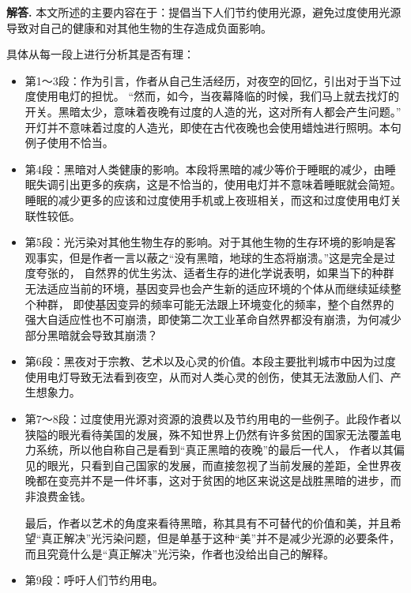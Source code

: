 \documentclass[12pt, a4paper, oneside]{ctexart}
\newenvironment{solution}[1][]{\par\noindent\textbf{#1解答. }}{\smallskip\par}  %
\begin{document}
\begin{solution}
    本文所述的主要内容在于：提倡当下人们节约使用光源，避免过度使用光源导致对自己的健康和对其他生物的生存造成负面影响。

    具体从每一段上进行分析其是否有理：
    \begin{itemize}
        \item 第1～3段：作为引言，作者从自己生活经历，对夜空的回忆，引出对于当下过度使用电灯的担忧。
        “然而，如今，当夜幕降临的时候，我们马上就去找灯的开关。黑暗太少，意味着夜晚有过度的人造的光，这对所有人都会产生问题。”
        开灯并不意味着过度的人造光，即使在古代夜晚也会使用蜡烛进行照明。本句例子使用不恰当。
        \item 第4段：黑暗对人类健康的影响。本段将黑暗的减少等价于睡眠的减少，由睡眠失调引出更多的疾病，这是不恰当的，使用电灯并不意味着睡眠就会简短。
        睡眠的减少更多的应该和过度使用手机或上夜班相关，而这和过度使用电灯关联性较低。
        \item 第5段：光污染对其他生物生存的影响。对于其他生物的生存环境的影响是客观事实，但是作者一言以蔽之“没有黑暗，地球的生态将崩溃。”这是完全是过度夸张的，
        自然界的优生劣汰、适者生存的进化学说表明，如果当下的种群无法适应当前的环境，基因变异也会产生新的适应环境的个体从而继续延续整个种群，
        即使基因变异的频率可能无法跟上环境变化的频率，整个自然界的强大自适应性也不可崩溃，即使第二次工业革命自然界都没有崩溃，为何减少部分黑暗就会导致其崩溃？
        \item 第6段：黑夜对于宗教、艺术以及心灵的价值。本段主要批判城市中因为过度使用电灯导致无法看到夜空，从而对人类心灵的创伤，使其无法激励人们、产生想象力。
        \item 第7～8段：过度使用光源对资源的浪费以及节约用电的一些例子。此段作者以狭隘的眼光看待美国的发展，殊不知世界上仍然有许多贫困的国家无法覆盖电力系统，所以他自称自己是看到“真正黑暗的夜晚”的最后一代人，
        作者以其偏见的眼光，只看到自己国家的发展，而直接忽视了当前发展的差距，全世界夜晚都在变亮并不是一件坏事，这对于贫困的地区来说这是战胜黑暗的进步，而非浪费金钱。

        最后，作者以艺术的角度来看待黑暗，称其具有不可替代的价值和美，并且希望“真正解决”光污染问题，但是单基于这种“美”并不是减少光源的必要条件，
        而且究竟什么是“真正解决”光污染，作者也没给出自己的解释。
        \item 第9段：呼吁人们节约用电。

    \end{itemize}
\end{solution}
\end{document}
